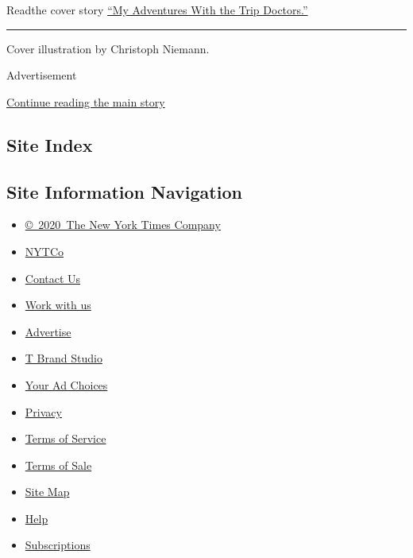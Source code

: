 Read\href{https://www.nytimes3xbfgragh.onion/magazine}{}the cover story
\href{https://www.nytimes3xbfgragh.onion/interactive/2018/05/15/magazine/health-issue-my-adventures-with-hallucinogenic-drugs-medicine.html}{``My
Adventures With the Trip Doctors.''}

\begin{center}\rule{0.5\linewidth}{\linethickness}\end{center}

Cover illustration by Christoph Niemann.

Advertisement

\protect\hyperlink{after-bottom}{Continue reading the main story}

\hypertarget{site-index}{%
\subsection{Site Index}\label{site-index}}

\hypertarget{site-information-navigation}{%
\subsection{Site Information
Navigation}\label{site-information-navigation}}

\begin{itemize}
\tightlist
\item
  \href{https://help.nytimes3xbfgragh.onion/hc/en-us/articles/115014792127-Copyright-notice}{©~2020~The
  New York Times Company}
\end{itemize}

\begin{itemize}
\tightlist
\item
  \href{https://www.nytco.com/}{NYTCo}
\item
  \href{https://help.nytimes3xbfgragh.onion/hc/en-us/articles/115015385887-Contact-Us}{Contact
  Us}
\item
  \href{https://www.nytco.com/careers/}{Work with us}
\item
  \href{https://nytmediakit.com/}{Advertise}
\item
  \href{http://www.tbrandstudio.com/}{T Brand Studio}
\item
  \href{https://www.nytimes3xbfgragh.onion/privacy/cookie-policy\#how-do-i-manage-trackers}{Your
  Ad Choices}
\item
  \href{https://www.nytimes3xbfgragh.onion/privacy}{Privacy}
\item
  \href{https://help.nytimes3xbfgragh.onion/hc/en-us/articles/115014893428-Terms-of-service}{Terms
  of Service}
\item
  \href{https://help.nytimes3xbfgragh.onion/hc/en-us/articles/115014893968-Terms-of-sale}{Terms
  of Sale}
\item
  \href{https://spiderbites.nytimes3xbfgragh.onion}{Site Map}
\item
  \href{https://help.nytimes3xbfgragh.onion/hc/en-us}{Help}
\item
  \href{https://www.nytimes3xbfgragh.onion/subscription?campaignId=37WXW}{Subscriptions}
\end{itemize}
